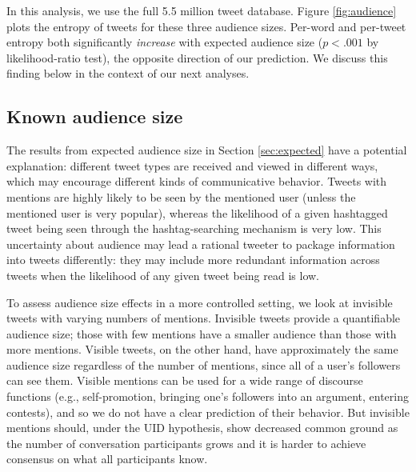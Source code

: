 \documentclass[11pt,letterpaper]{article}
\begin{document}
In this analysis, we use the full 5.5 million tweet database. Figure \ref{fig:audience} plots the entropy of tweets for these three audience sizes.  Per-word and per-tweet entropy both significantly {\it increase} with expected audience size ($p < .001$ by likelihood-ratio test), the opposite direction of our prediction. We discuss this finding below in the context of our next analyses. 


\subsection{Known audience size}

The results from expected audience size in Section \ref{sec:expected} have a potential explanation: different tweet types are received and viewed in different ways, which may encourage different kinds of communicative behavior.  Tweets with mentions are highly likely to be seen by the mentioned user (unless the mentioned user is very popular), whereas the likelihood of a given hashtagged tweet being seen through the hashtag-searching mechanism is very low.  This uncertainty about audience may lead a rational tweeter to package information into tweets differently: they may include more redundant information across tweets when the likelihood of any given tweet being read is low.

To assess audience size effects in a more controlled setting, we look at invisible tweets with varying numbers of mentions.  Invisible tweets provide a quantifiable audience size; those with few mentions have a smaller audience than those with more mentions.  Visible tweets, on the other hand, have approximately the same audience size regardless of the number of mentions, since all of a user's followers can see them. Visible mentions can be used for a wide range of discourse functions (e.g., self-promotion, bringing one's followers into an argument, entering contests), and so we do not have a clear prediction of their behavior. But invisible mentions should, under the UID hypothesis, show decreased common ground as the number of conversation participants grows and it is harder to achieve consensus on what all participants know.
\end{document}

